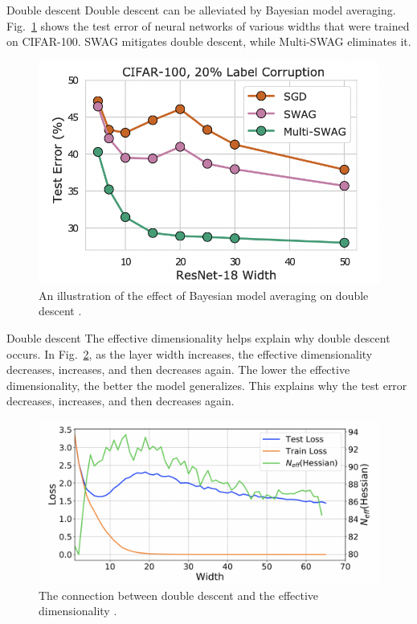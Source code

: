 \documentclass{beamer}
\begin{document}
\begin{frame}{Double descent}
    Double descent can be alleviated by Bayesian model averaging. Fig.~\ref{fig:double_descent_and_bma} shows the test error of neural networks of various widths that were trained on CIFAR-100. SWAG mitigates double descent, while Multi-SWAG eliminates it.
    \begin{figure}
        \centering
        \includegraphics[scale=0.5]{double_descent_and_bma}
        \caption{An illustration of the effect of Bayesian model averaging on double descent \cite{pml2Book}.}
        \label{fig:double_descent_and_bma}
    \end{figure}
\end{frame}

\begin{frame}{Double descent}
    The effective dimensionality helps explain why double descent occurs. In Fig.~\ref{fig:double_descent_and_effective_dimensionality}, as the layer width increases, the effective dimensionality decreases, increases, and then decreases again. The lower the effective dimensionality, the better the model generalizes. This explains why the test error decreases, increases, and then decreases again.
    \begin{figure}
        \centering
        \includegraphics[scale=0.4]{double_descent_and_effective_dimensionality}
        \caption{The connection between double descent and the effective dimensionality \cite{pml2Book}.}
        \label{fig:double_descent_and_effective_dimensionality}
    \end{figure}
\end{frame}
\end{document}
